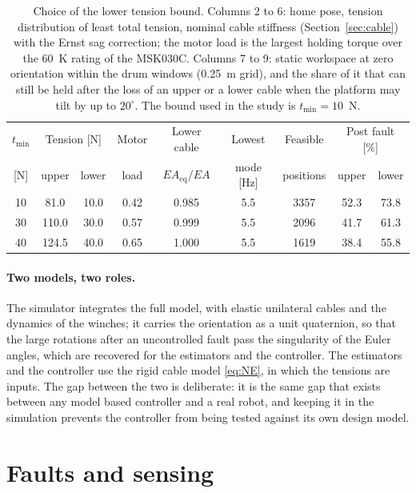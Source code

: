 \documentclass[10pt]{article}
\begin{document}
\begin{table}[t]
\centering
\caption{Choice of the lower tension bound. Columns 2 to 6: home pose, tension distribution of least total tension, nominal cable stiffness (Section~\ref{sec:cable}) with the Ernst sag correction; the motor load is the largest holding torque over the 60~K rating of the MSK030C. Columns 7 to 9: static workspace at zero orientation within the drum windows (0.25~m grid), and the share of it that can still be held after the loss of an upper or a lower cable when the platform may tilt by up to $20^\circ$. The bound used in the study is $t_{\min}=10$~N.}\label{tab:tmin}
\begin{tabular}{@{}ccccccccc@{}}
\toprule
$t_{\min}$ & \multicolumn{2}{c}{Tension [N]} & Motor & Lower cable & Lowest & Feasible & \multicolumn{2}{c}{Post fault [\%]}\\
\cmidrule(lr){2-3}\cmidrule(lr){8-9}
[N] & upper & lower & load & $EA_{\mathrm{eq}}/EA$ & mode [Hz] & positions & upper & lower\\
\midrule
10 & 81.0 & 10.0 & 0.42 & 0.985 & 5.5 & 3357 & 52.3 & 73.8\\
30 & 110.0 & 30.0 & 0.57 & 0.999 & 5.5 & 2096 & 41.7 & 61.3\\
40 & 124.5 & 40.0 & 0.65 & 1.000 & 5.5 & 1619 & 38.4 & 55.8\\
\bottomrule
\end{tabular}
\end{table}

\paragraph{Two models, two roles.} The simulator integrates the full model, with elastic unilateral cables and the dynamics of the winches; it carries the orientation as a unit quaternion, so that the large rotations after an uncontrolled fault pass the singularity of the Euler angles, which are recovered for the estimators and the controller. The estimators and the controller use the rigid cable model \eqref{eq:NE}, in which the tensions are inputs. The gap between the two is deliberate: it is the same gap that exists between any model based controller and a real robot, and keeping it in the simulation prevents the controller from being tested against its own design model.

\section{Faults and sensing}\label{sec:faults}
\end{document}
